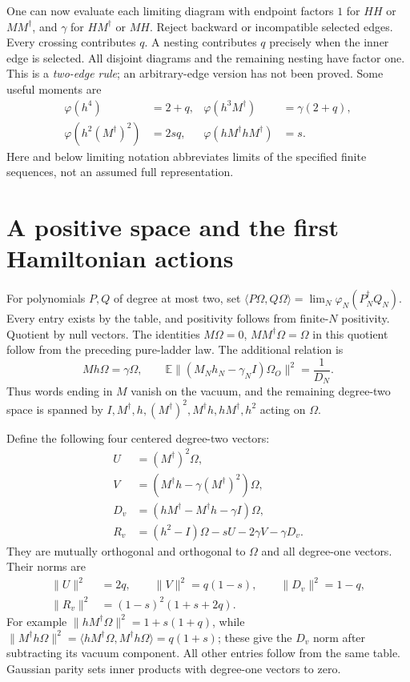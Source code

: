 \documentclass[11pt]{article}
\newcommand{\EE}{\mathbb E}
\newcommand{\Om}{\Omega_O}
\newcommand{\ph}{\varphi}
\begin{document}
\newpage
One can now evaluate each limiting diagram with endpoint factors
$1$ for $HH$ or $MM^\dagger$, and $\gamma$ for $HM^\dagger$
or $MH$. Reject backward or incompatible selected edges.
Every crossing contributes $q$. A nesting contributes $q$
precisely when the inner edge is selected. All disjoint diagrams
and the remaining nesting have factor one. This is a
\emph{two-edge rule}; an arbitrary-edge version has not been proved.
Some useful moments are
\begin{align}
 \ph(h^4)&=2+q,&\ph(h^3M^\dagger)&=\gamma(2+q),\\
 \ph(h^2(M^\dagger)^2)&=2s q,
 &\ph(hM^\dagger hM^\dagger)&=s.
\end{align}
Here and below limiting notation abbreviates limits of the
specified finite sequences, not an assumed full representation.

\section{A positive space and the first Hamiltonian actions}
For polynomials $P,Q$ of degree at most two, set
$\langle P\Omega,Q\Omega\rangle=\lim_N\ph_N(P_N^\dagger Q_N)$.
Every entry exists by the table, and positivity follows from
finite-$N$ positivity. Quotient by null vectors. The identities
$M\Omega=0$, $MM^\dagger\Omega=\Omega$ in this quotient follow
from the preceding pure-ladder law. The additional relation is
\begin{equation}\label{Mh}
 M h\Omega=\gamma\Omega,
 \qquad
 \EE\|(M_Nh_N-\gamma_N I)\Om\|^2=\frac1{D_N}.
\end{equation}
Thus words ending in $M$ vanish on the vacuum, and the remaining
degree-two space is spanned by $I,M^\dagger,h,(M^\dagger)^2,
M^\dagger h,hM^\dagger,h^2$ acting on $\Omega$.

Define the following four centered degree-two vectors:
\begin{align}
 U&=(M^\dagger)^2\Omega,\\
 V&=\left(M^\dagger h-\gamma(M^\dagger)^2\right)\Omega,\\
 D_v&=\left(hM^\dagger-M^\dagger h-\gamma I\right)\Omega,\\
 R_v&=(h^2-I)\Omega-sU-2\gamma V-\gamma D_v.
\end{align}
They are mutually orthogonal and orthogonal to $\Omega$ and all
degree-one vectors. Their norms are
\begin{equation}\label{norms}
 \begin{split}
 \|U\|^2&=2q,\qquad \|V\|^2=q(1-s),\qquad\|D_v\|^2=1-q,\\
 \|R_v\|^2&=(1-s)^2(1+s+2q).
 \end{split}
\end{equation}
For example $\|hM^\dagger\Omega\|^2=1+s(1+q)$, while
$\|M^\dagger h\Omega\|^2=
\langle hM^\dagger\Omega,M^\dagger h\Omega\rangle=q(1+s)$;
these give the $D_v$ norm after subtracting its vacuum component.
All other entries follow from the same table. Gaussian parity
sets inner products with degree-one vectors to zero.
\end{document}
